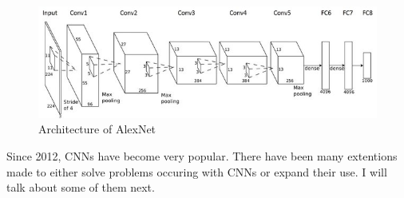 \begin{figure}[ht]
    \centering
    \includegraphics{images/alex-net.jpg}
    \caption[Architecture of AlexNet]{Architecture of AlexNet \cite{alexnet2012}}
    \label{fig:alexnet}
\end{figure}

Since 2012, CNNs have become very popular. There have been many extentions made to either solve problems occuring with CNNs or expand their use. I will talk about some of them next.










